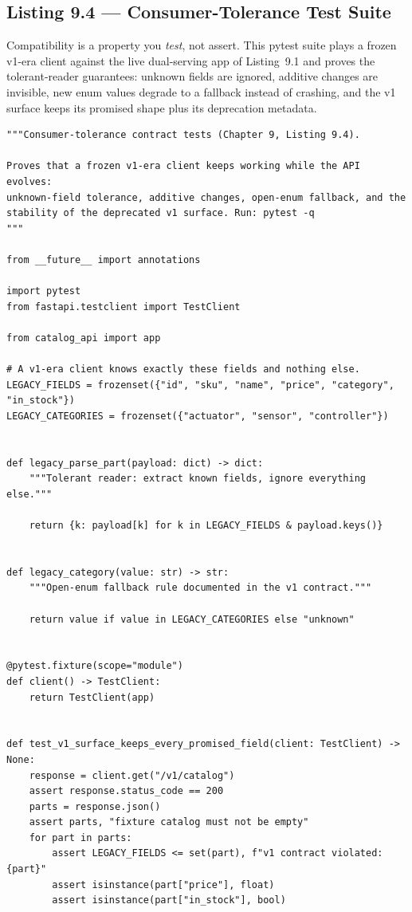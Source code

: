 \subsection{Listing 9.4 --- Consumer-Tolerance Test Suite}
\label{subsec:ch9-listing4}

Compatibility is a property you \emph{test}, not assert. This pytest suite
plays a frozen v1-era client against the live dual-serving app of
Listing~9.1 and proves the tolerant-reader guarantees: unknown fields are
ignored, additive changes are invisible, new enum values degrade to a
fallback instead of crashing, and the v1 surface keeps its promised shape
plus its deprecation metadata.

\begin{verbatim}
"""Consumer-tolerance contract tests (Chapter 9, Listing 9.4).

Proves that a frozen v1-era client keeps working while the API evolves:
unknown-field tolerance, additive changes, open-enum fallback, and the
stability of the deprecated v1 surface. Run: pytest -q
"""

from __future__ import annotations

import pytest
from fastapi.testclient import TestClient

from catalog_api import app

# A v1-era client knows exactly these fields and nothing else.
LEGACY_FIELDS = frozenset({"id", "sku", "name", "price", "category", "in_stock"})
LEGACY_CATEGORIES = frozenset({"actuator", "sensor", "controller"})


def legacy_parse_part(payload: dict) -> dict:
    """Tolerant reader: extract known fields, ignore everything else."""

    return {k: payload[k] for k in LEGACY_FIELDS & payload.keys()}


def legacy_category(value: str) -> str:
    """Open-enum fallback rule documented in the v1 contract."""

    return value if value in LEGACY_CATEGORIES else "unknown"


@pytest.fixture(scope="module")
def client() -> TestClient:
    return TestClient(app)


def test_v1_surface_keeps_every_promised_field(client: TestClient) -> None:
    response = client.get("/v1/catalog")
    assert response.status_code == 200
    parts = response.json()
    assert parts, "fixture catalog must not be empty"
    for part in parts:
        assert LEGACY_FIELDS <= set(part), f"v1 contract violated: {part}"
        assert isinstance(part["price"], float)
        assert isinstance(part["in_stock"], bool)



\end{verbatim}

